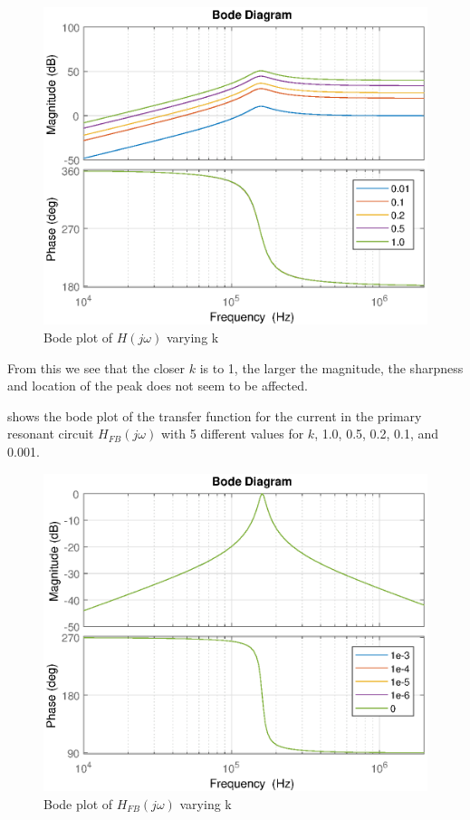 \begin{figure}[H]
    \centering
    \includegraphics[width=\textwidth]{img/CoilRigBode_k.eps}
    \caption{Bode plot of $H(j\omega)$ varying k}
    \label{fig:bode_k}
\end{figure}

From this we see that the closer $k$ is to 1, the larger the magnitude, the sharpness and location of the peak does not seem to be affected.

 shows the bode plot of the transfer function for the current in the primary resonant circuit $H_{FB}(j\omega)$ with 5 different values for $k$, 1.0, 0.5, 0.2, 0.1, and 0.001.
\begin{figure}[H]
    \centering
    \includegraphics[width=\textwidth]{img/FeedBackBode_k.eps}
    \caption{Bode plot of $H_{FB}(j\omega)$ varying k}
    \label{fig:fbbode_k}
\end{figure}

